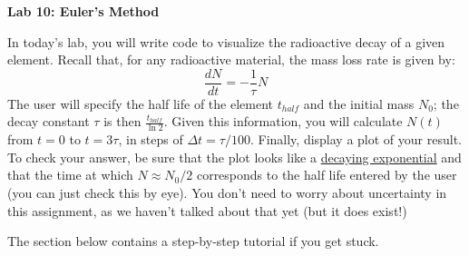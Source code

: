 \documentclass{article}
\begin{document}
\fancyfoot[C]{\thepage}
\vspace*{0cm}
\begin{center}
	{\LARGE \textbf{Lab 10: Euler's Method}}\\
	\vspace{.25cm}
\end{center}
In today's lab, you will write code to visualize the radioactive decay of a given element. Recall that, for any radioactive material, the mass loss rate is given by:
\begin{equation*}
	\frac{dN}{dt}=-\frac{1}{\tau}N
\end{equation*} The user will specify the half life of the element $t_{half}$ and the initial mass $N_0$; the decay constant $\tau$ is then $\frac{t_{half}}{\ln{2}}$. Given this information, you will calculate $N(t)$ from $t=0$ to $t=3\tau$, in steps of $\Delta t=\tau/100$. Finally, display a plot of your result. To check your answer, be sure that the plot looks like a \href{https://en.wikipedia.org/wiki/Exponential_decay}{decaying exponential} and that the time at which $N\approx N_0/2$ corresponds to the half life entered by the user (you can just check this by eye). You don't need to worry about uncertainty in this assignment, as we haven't talked about that yet (but it does exist!)

The section below contains a step-by-step tutorial if you get stuck.
\end{document}
